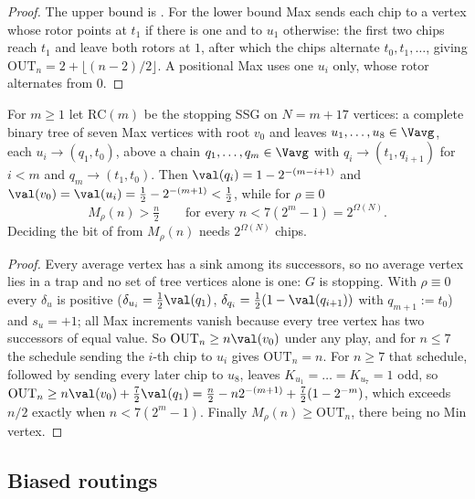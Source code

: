 \begin{proof}
The upper bound is .  For the lower bound Max sends
each chip to a vertex whose rotor points at $t_1$ if there is one and to $u_1$
otherwise: the first two chips reach $t_1$ and leave both rotors at $1$, after
which the chips alternate $t_0,t_1,\dots$, giving
$\mathrm{OUT}_n=2+\lfloor(n-2)/2\rfloor$.  A positional Max uses one $u_i$ only,
whose rotor alternates from $0$.
\end{proof}

\begin{theorem}\label{fresh19:thm-chips}
For $m\ge1$ let $\mathrm{RC}(m)$ be the stopping SSG on $N=m+17$ vertices: a
complete binary tree of seven Max vertices with root $v_0$ and leaves
$u_1,\dots,u_8\in\Vavg$, each $u_i\to(q_1,t_0)$, above a chain
$q_1,\dots,q_m\in\Vavg$ with $q_i\to(t_1,q_{i+1})$ for $i<m$ and
$q_m\to(t_1,t_0)$.  Then $\val(q_i)=1-2^{-(m-i+1)}$ and
$\val(v_0)=\val(u_i)=\tfrac12-2^{-(m+1)}<\tfrac12$, while for $\rho\equiv0$
\[
   M_\rho(n)>\tfrac n2\qquad\text{for every }n<7(2^{m}-1)=2^{\Omega(N)} .
\]
Deciding the bit of  from $M_\rho(n)$ needs $2^{\Omega(N)}$ chips.
\end{theorem}

\begin{proof}
Every average vertex has a sink among its successors, so no average vertex lies
in a trap and no set of tree vertices alone is one: $G$ is stopping.  With
$\rho\equiv0$ every $\delta_u$ is positive ($\delta_{u_i}=\tfrac12\val(q_1)$,
$\delta_{q_i}=\tfrac12(1-\val(q_{i+1}))$ with $q_{m+1}:=t_0$) and $s_u=+1$; all
Max increments vanish because every tree vertex has two successors of equal
value.  So $\mathrm{OUT}_n\ge n\val(v_0)$ under any play, and for $n\le7$ the
schedule sending the $i$-th chip to $u_i$ gives $\mathrm{OUT}_n=n$.  For $n\ge7$
that schedule, followed by sending every later chip to $u_8$, leaves
$K_{u_1}=\dots=K_{u_7}=1$ odd, so
$\mathrm{OUT}_n\ge n\val(v_0)+\tfrac72\val(q_1)
=\tfrac n2-n2^{-(m+1)}+\tfrac72(1-2^{-m})$, which exceeds $n/2$ exactly when
$n<7(2^{m}-1)$.  Finally $M_\rho(n)\ge\mathrm{OUT}_n$, there being no Min vertex.
\end{proof}

\subsection{Biased routings}

